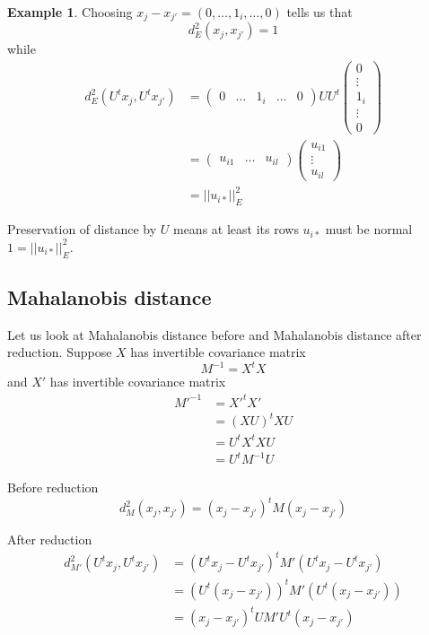 \documentclass[11pt]{amsart}
\theoremstyle{definition}
\newtheorem{example}[theorem]{Example}
\begin{document}
\begin{example} Choosing $x_j - x_{j'} = (0, \dots , 1_i , \dots , 0)$ tells us that
$$d_E^2 (x_j, x_{j'}) = 1$$
while
\begin{align*}
d_E^2 (U^t x_j, U^t x_{j'}) & = \left( \begin{array}{ccccc} 0 & \dots & 1_i & \dots & 0 \end{array} \right) UU^t \left( \begin{array}{c} 0 \\ \vdots \\ 1_i \\ \vdots \\ 0 \end{array} \right) \\
 & = \left( \begin{array}{ccc} u_{i1} & \dots & u_{il} \end{array} \right) \left( \begin{array}{c} u_{i1} \\ \vdots \\ u_{il} \end{array} \right) \\
 & = ||u_{i \ast}||^2_E
\end{align*}

Preservation of distance by $U$ means at least its rows $u_{i \ast}$ must be normal $1 = ||u_{i \ast}||^2_E$.
\end{example}


\subsection{Mahalanobis distance} \label{Mahalanobisdistance} Let us look at Mahalanobis distance before and Mahalanobis distance after reduction. Suppose $X$ has invertible covariance matrix
$$M^{-1} = X^t X$$
and $X'$ has invertible covariance matrix
\begin{align*}
M'^{-1} & = X'^t X' \\
 & = (XU)^t XU \\
 & = U^t X^t X U \\
 & = U^t M^{-1} U
\end{align*}

Before reduction
$$d_M^2 (x_j, x_{j'}) = (x_j - x_{j'})^t M (x_j - x_{j'})$$

After reduction
\begin{align*}
d_{M'}^2 (U^t x_j, U^t x_{j'}) & = (U^t x_j - U^t x_{j'})^t M' (U^t x_j - U^t x_{j'}) \\
 & = (U^t (x_j - x_{j'}))^t M' (U^t (x_j - x_{j'})) \\
 & = (x_j - x_{j'})^t UM' U^t (x_j - x_{j'})
\end{align*}
\end{document}
